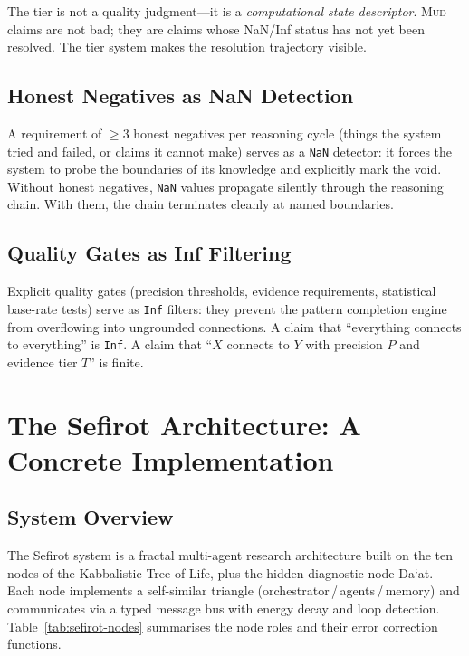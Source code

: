 \documentclass[11pt]{article}
\theoremstyle{definition}
\theoremstyle{remark}
\newcommand{\NaN}{\texttt{NaN}}
\newcommand{\Inf}{\texttt{Inf}}
\newcommand{\MUD}{\textsc{Mud}}
\begin{document}
The tier is not a quality judgment---it is a \emph{computational state
descriptor}.  \MUD{} claims are not bad; they are claims whose NaN/Inf status has
not yet been resolved.  The tier system makes the resolution trajectory visible.

\subsection{Honest Negatives as NaN Detection}
\label{sec:honest-negatives}

A requirement of $\geq 3$ honest negatives per reasoning cycle (things the system
tried and failed, or claims it cannot make) serves as a \NaN{} detector: it forces
the system to probe the boundaries of its knowledge and explicitly mark the void.
Without honest negatives, \NaN{} values propagate silently through the reasoning
chain.  With them, the chain terminates cleanly at named boundaries.

\subsection{Quality Gates as Inf Filtering}
\label{sec:quality-gates}

Explicit quality gates (precision thresholds, evidence requirements, statistical
base-rate tests) serve as \Inf{} filters: they prevent the pattern completion
engine from overflowing into ungrounded connections.  A claim that ``everything
connects to everything'' is \Inf.  A claim that ``$X$ connects to $Y$ with
precision $P$ and evidence tier $T$'' is finite.

\section{The Sefirot Architecture: A Concrete Implementation}
\label{sec:sefirot}

\subsection{System Overview}
\label{sec:sefirot-overview}

The Sefirot system is a fractal multi-agent research architecture built on the
ten nodes of the Kabbalistic Tree of Life, plus the hidden diagnostic node
Da\textquoteleft at.  Each node implements a self-similar triangle
(orchestrator\,/\,agents\,/\,memory) and communicates via a typed message bus
with energy decay and loop detection.
Table~\ref{tab:sefirot-nodes} summarises the node roles and their error
correction functions.
\end{document}
